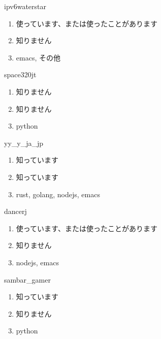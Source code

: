 \begin{prework}{ ipv6waterstar }
  \begin{enumerate}
  \item 使っています、または使ったことがあります
  \item 知りません
  \item emacs, その他
  \end{enumerate}
\end{prework}

\begin{prework}{ space320jt }
  \begin{enumerate}
  \item 知りません
  \item 知りません
  \item python
  \end{enumerate}
\end{prework}

\begin{prework}{ yy\_y\_ja\_jp }
  \begin{enumerate}
  \item 知っています
  \item 知っています
  \item rust, golang, nodejs, emacs
  \end{enumerate}
\end{prework}

\begin{prework}{ dancerj }
  \begin{enumerate}
  \item 使っています、または使ったことがあります
  \item 知りません
  \item nodejs, emacs
  \end{enumerate}
\end{prework}

\begin{prework}{ sambar\_gamer }
  \begin{enumerate}
  \item 知っています
  \item 知りません
  \item python
  \end{enumerate}
\end{prework}
